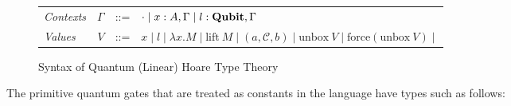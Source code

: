 \documentclass[acmsmall,nonacm,timestamp]{acmart}
\newcommand{\qwire}{\ensuremath{\mathcal{Q}\textsc{wire}}\xspace}
\newcommand{\type}[1]{\textrm{\textbf{#1}}}
\begin{document}
\begin{figure}[h]
\begin{tabular}{lrcl}
		\textit{Contexts} & $\Gamma$ & ::= & $ \cdot \mid x : A, \Gamma \mid l : \type{Qubit}, \Gamma$ \\
		\textit{Values} & $V$ & ::= & \begin{minipage}[t]{0.5\columnwidth}%
	$ x \mid l \mid \lambda x.M \mid \mathrm{lift}~M \mid (a, \mathcal{C}, b) \mid \mathrm{unbox}~V \mid \mathrm{force}(\mathrm{unbox}~V) \mid $
\end{minipage}\\
	\end{tabular}
	\caption{Syntax of Quantum (Linear) Hoare Type Theory}
	\label{fig:syntax}
\end{figure}

%
%
%
%
%

The primitive quantum gates that are treated as constants in the language have types such as follows:
\end{document}
